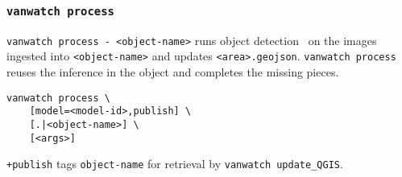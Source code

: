 \subsubsection{\texttt{vanwatch process}}
\label{vanwatch_process}

\texttt{vanwatch process - <object-name>} runs object detection~ on the images ingested into \texttt{<object-name>} and updates \texttt{<area>.geojson}. \texttt{vanwatch process} reuses the inference in the object and completes the missing pieces.
%
\begin{verbatim}
vanwatch process \
    [model=<model-id>,publish] \
    [.|<object-name>] \
    [<args>]
\end{verbatim}
%
\texttt{+publish} tags \texttt{object-name} for retrieval by \texttt{vanwatch update\_QGIS}.
